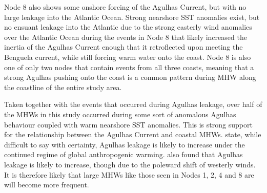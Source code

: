 \documentclass[utf8]{frontiersSCNS}
\begin{document}
Node 8 also shows some onshore forcing of the Agulhas Current, but with no large leakage into the Atlantic Ocean. Strong nearshore SST anomalies exist, but no ensuant leakage into the Atlantic due to the strong easterly wind anomalies over the Atlantic Ocean during the events in Node 8 that likely increased the inertia of the Agulhas Current enough that it retroflected upon meeting the Benguela current, while still forcing warm water onto the coast. Node 8 is also one of only two nodes that contain events from all three coasts, meaning that a strong Agulhas pushing onto the coast is a common pattern during MHW along the coastline of the entire study area.

Taken together with the events that occurred during Agulhas leakage, over half of the MHWs in this study occurred during some sort of anomalous Agulhas behaviour coupled with warm nearshore SST anomalies. This is strong support for the relationship between the Agulhas Current and coastal MHWs. \citet{Beal2011} state, while difficult to say with certainty, Agulhas leakage is likely to increase under the continued regime of global anthropogenic warming. \citet{Biastoch2009} also found that Agulhas leakage is likely to increase, though due to the poleward shift of westerly winds. It is therefore likely that large MHWs like those seen in Nodes 1, 2, 4 and 8 are will become more frequent.
\end{document}
